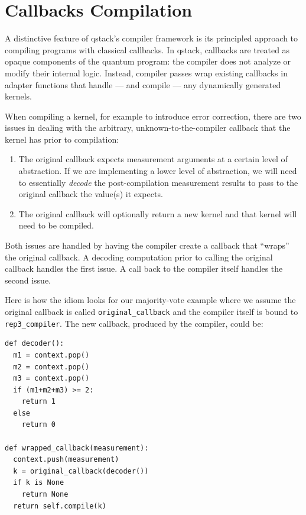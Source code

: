\section{Callbacks Compilation}\label{sec:callbacks}

A distinctive feature of qstack's compiler framework is its principled approach to compiling programs with classical callbacks. In qstack, callbacks are treated as opaque components of the quantum program: the compiler does not analyze or modify their internal logic. Instead, compiler passes wrap existing callbacks in adapter functions that handle --- and compile --- any dynamically generated kernels.


When compiling a kernel, for example to introduce error correction, there are two issues in dealing with the arbitrary, unknown-to-the-compiler callback that the kernel has prior to compilation:
\begin{enumerate}
\item The original callback expects measurement arguments at a certain level of abstraction. If we are implementing a lower level of abstraction, we will need to essentially \emph{decode} the post-compilation measurement results to pass to the original callback
the value(s) it expects.
\item The original callback will optionally return a new kernel and that kernel will need to be compiled.
\end{enumerate}
Both issues are handled by having the compiler create a callback that ``wraps'' the original callback. A decoding computation prior to calling the original callback handles the first issue. A call back to the compiler itself handles the second issue.

Here is how the idiom looks for our majority-vote example where we assume the original callback is called \texttt{original\_callback} and the compiler itself is bound to \texttt{rep3\_compiler}. The new callback, produced by the compiler, could be:
\begin{verbatim}
def decoder():
  m1 = context.pop()
  m2 = context.pop()
  m3 = context.pop()
  if (m1+m2+m3) >= 2:
    return 1 
  else
    return 0
  
def wrapped_callback(measurement):
  context.push(measurement)
  k = original_callback(decoder())
  if k is None
    return None
  return self.compile(k)
\end{verbatim}

